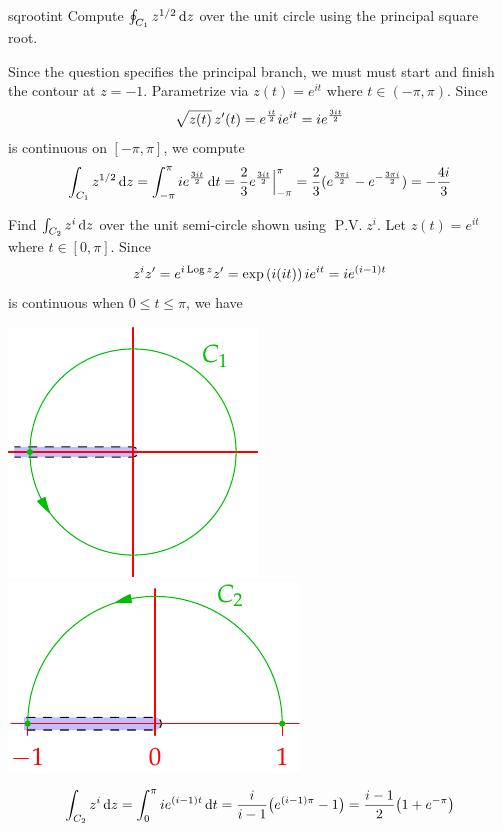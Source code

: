 \begin{examples}{}{sqrootint}
	\exstart Compute $\oint_{C_1}z^{1/2}\,{\mathrm{d} z}$ over the unit circle using the principal square root.
	\begin{enumerate}\setcounter{enumi}{1}
		\begin{minipage}[t]{0.65\linewidth}\vspace{-7pt}
			\item[]Since the question specifies the principal branch, we must must start and finish the contour at $z=-1$. Parametrize via $z(t)=e^{it}$ where $t\in(-\pi,\pi)$. Since
			\[
				\sqrt{z(t)}\,z'(t)=e^{\frac{it}{2}}ie^{it}=ie^{\frac{3it}{2}}
			\]
			is continuous on $[-\pi,\pi]$, we compute
			\[
				\int_{C_1}z^{1/2}\,{\mathrm{d} z}=\int_{-\pi}^\pi ie^{\frac{3it}{2}}\,{\mathrm{d} t} =\frac 23e^{\frac{3it}{2}}\Big|_{-\pi}^{\pi} =\frac 23(e^{\frac{3\pi i}{2}}-e^{-\frac{3\pi i}{2}})=-\frac{4i}3
			\]
		
			\item Find $\int_{C_2}z^i\,{\mathrm{d} z}$ over the unit semi-circle shown using $\operatorname{P.V.}z^i$.\smallbreak
			Let $z(t)=e^{it}$ where $t\in[0,\pi]$. Since
			\[
				z^iz'=e^{i\operatorname{Log} z}z'=\exp\left(i(it)\right)ie^{it}=ie^{(i-1)t}
			\]
			is continuous when $0\le t\le \pi$, we have
		\end{minipage}
		\hfill
		\begin{minipage}[t]{0.34\linewidth}\vspace{-10pt}
			\flushright\includegraphics{contour-branch2}\bigbreak\medbreak
			\includegraphics{contour-branch3}
		\end{minipage}
		\[
			\int_{C_2}z^i\,{\mathrm{d} z}=\int_0^\pi ie^{(i-1)t}\,{\mathrm{d} t} =\frac{i}{i-1}\bigl(e^{(i-1)\pi}-1\bigr) =\frac{i-1}{2}\bigl(1+e^{-\pi}\bigr)
		\]
	\end{enumerate}
\end{examples}


